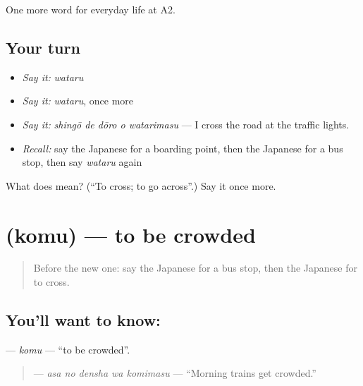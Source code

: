 \begin{grammarlens}[title={What you've built}]
One more word for everyday life at A2.
\end{grammarlens}

\subsection*{Your turn}
\begin{itemize}
\raggedright
  \item \emph{Say it:} \emph{wataru}
  \item \emph{Say it:} \emph{wataru}, once more
  \item \emph{Say it:} \emph{shingō de dōro o watarimasu} — I cross the road at the traffic lights.
  \item \emph{Recall:} say the Japanese for a boarding point, then the Japanese for a bus stop, then say \emph{wataru} again
\end{itemize}

\begin{tcolorbox}[breakable,colback=teal!4,colframe=teal!35!black,title={Before you move on}]
What does  mean? (\textquotedblleft{}To cross; to go across\textquotedblright{}.) Say it once more.
\end{tcolorbox}
\section[\texorpdfstring{\ja{こむ} (komu)}{こむ (komu)}]{ (komu) — to be crowded}

\label{lesson:JA-C201-komu}



\begin{quote}
Before the new one: say the Japanese for a bus stop, then the Japanese for to cross.
\end{quote}

\subsection*{You'll want to know: }
\textbf{} — \emph{komu} — \textquotedblleft{}to be crowded\textquotedblright{}.

\begin{quote}
\textbf{  } — \emph{asa no densha wa komimasu} — \textquotedblleft{}Morning trains get crowded.\textquotedblright{}
\end{quote}

